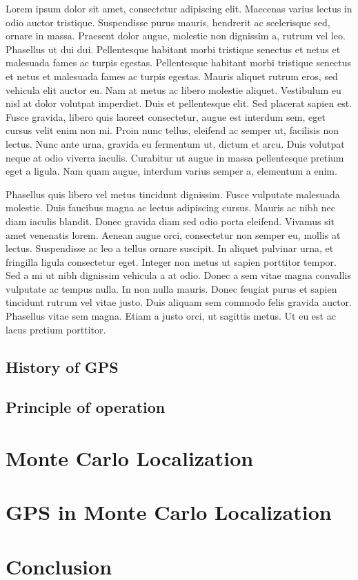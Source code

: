\documentclass[11pt,a4paper,pdftex,twoside]{memoir}
\begin{document}
Lorem ipsum dolor sit amet, consectetur adipiscing elit. Maecenas varius lectus in odio auctor tristique. Suspendisse purus mauris, hendrerit ac scelerisque sed, ornare in massa. Praesent dolor augue, molestie non dignissim a, rutrum vel leo. Phasellus ut dui dui. Pellentesque habitant morbi tristique senectus et netus et malesuada fames ac turpis egestas. Pellentesque habitant morbi tristique senectus et netus et malesuada fames ac turpis egestas. Mauris aliquet rutrum eros, sed vehicula elit auctor eu. Nam at metus ac libero molestie aliquet. Vestibulum eu nisl at dolor volutpat imperdiet. Duis et pellentesque elit. Sed placerat sapien est. Fusce gravida, libero quis laoreet consectetur, augue est interdum sem, eget cursus velit enim non mi. Proin nunc tellus, eleifend ac semper ut, facilisis non lectus. Nunc ante urna, gravida eu fermentum ut, dictum et arcu. Duis volutpat neque at odio viverra iaculis. Curabitur ut augue in massa pellentesque pretium eget a ligula. Nam quam augue, interdum varius semper a, elementum a enim.

Phasellus quis libero vel metus tincidunt dignissim. Fusce vulputate malesuada molestie. Duis faucibus magna ac lectus adipiscing cursus. Mauris ac nibh nec diam iaculis blandit. Donec gravida diam sed odio porta eleifend. Vivamus sit amet venenatis lorem. Aenean augue orci, consectetur non semper eu, mollis at lectus. Suspendisse ac leo a tellus ornare suscipit. In aliquet pulvinar urna, et fringilla ligula consectetur eget. Integer non metus ut sapien porttitor tempor. Sed a mi ut nibh dignissim vehicula a at odio. Donec a sem vitae magna convallis vulputate ac tempus nulla. In non nulla mauris. Donec feugiat purus et sapien tincidunt rutrum vel vitae justo. Duis aliquam sem commodo felis gravida auctor. Phasellus vitae sem magna. Etiam a justo orci, ut sagittis metus. Ut eu est ac lacus pretium porttitor.

\section{History of GPS}

\section{Principle of operation}


\chapter{Monte Carlo Localization}

\chapter{GPS in Monte Carlo Localization}

\chapter{Conclusion}


\end{document}
